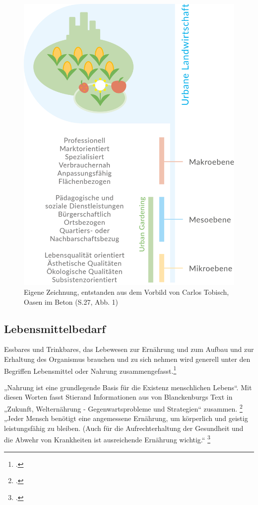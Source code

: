 \documentclass{scrartcl}
\begin{document}
\begin{figure}[htbp]
\centering
\includegraphics[width=12cm]{image_folder/SchaubildULvsUG.png}
\caption{Eigene Zeichnung, entstanden aus dem Vorbild von Carlos Tobisch, Oasen im Beton (S.27, Abb. 1)}
\label{fig:ul_typologie}
\end{figure}

\subsection{Lebensmittelbedarf}

Essbares und Trinkbares, das Lebewesen zur Ernährung und zum Aufbau und zur Erhaltung des Organismus brauchen und zu sich nehmen wird generell unter den Begriffen Lebensmittel oder Nahrung zusammengefasst.\footcite{DudenLebensmittel}

„Nahrung ist eine grundlegende Basis für die Existenz menschlichen Lebens“. Mit diesen Worten fasst Stierand Informationen aus von Blanckenburgs Text in „Zukunft, Welternährung - Gegenwartsprobleme und Strategien“ zusammen. \footcite[S.122f]{Stierand2008StadtLebensmittel} „Jeder Mensch benötigt eine angemessene Ernährung, um körperlich und geistig leistungsfähig zu bleiben. (Auch für die Aufrechterhaltung der Gesundheit und die Abwehr von Krankheiten ist ausreichende Ernährung wichtig.“ \footcite{Blanckenburg1987ZukunftDie}
\end{document}
